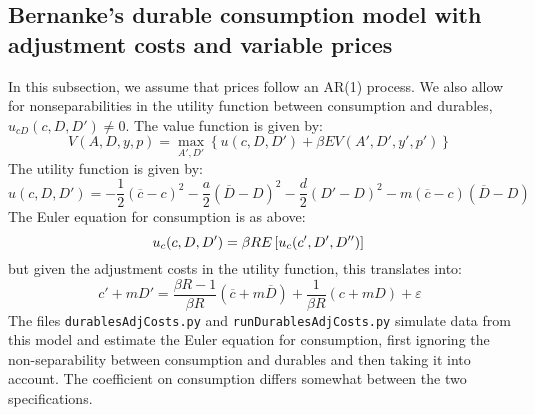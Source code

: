 \subsection{Bernanke's durable consumption model with adjustment costs and variable prices}

In this subsection, we assume that prices follow an AR(1) process. We also allow for nonseparabilities in the utility function between consumption and durables, \(u_{cD}(c, D, D') \neq 0\). The value function is given by:
%
\begin{equation}
	V(A, D, y, p) = \max_{A', D'} \left\{ u(c, D, D') + \beta EV(A', D', y', p') \right\}
\end{equation}
%
The utility function is given by:
%
\begin{equation}
 u(c, D, D') = -\frac{1}{2}(\overline{c} - c)^2 - \frac{a}{2}(\overline{D} - D)^2  - \frac{d}{2}(D' - D)^2 - m(\overline{c} - c)(\overline{D} - D) \label{eqn:utilnonsep}
\end{equation}
%
The Euler equation for consumption is as above:
%
\begin{equation}
 u_c(c, D, D') = \beta R E \left[u_c(c', D', D'')\right] \\
\end{equation}
%
but given the adjustment costs in the utility function, this translates into:
%
\begin{equation}
	c' + mD' = \frac{\beta R - 1}{\beta R}(\overline{c} + m\overline{D}) + \frac{1}{\beta R}(c + mD) + \varepsilon
\end{equation}
%
The files \texttt{durablesAdjCosts.py} and \texttt{runDurablesAdjCosts.py} simulate data from this model and estimate the Euler equation for consumption, first ignoring the non-separability between consumption and durables and then taking it into account. The coefficient on consumption differs somewhat between the two specifications.


